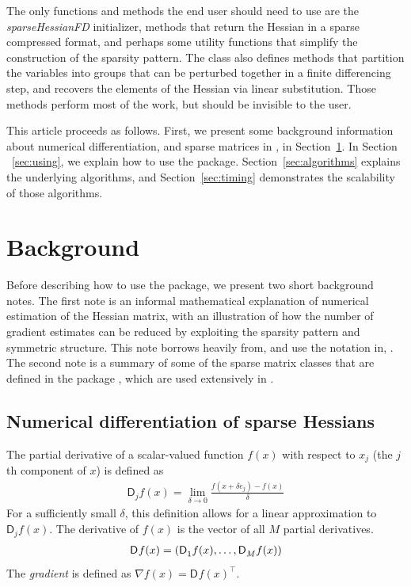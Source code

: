 \documentclass[article]{jss}\usepackage[]{graphicx}\usepackage[]{color}
\newcommand{\class}[1]{\textsl{#1}}
\newcommand{\parD}[3]{\mathsf{D}^{#1}_{#2}#3}
\begin{document}
The only functions and methods the end user should need to use are the
\class{sparseHessianFD} initializer, methods that return the Hessian
in a sparse compressed format, and perhaps some utility functions that
simplify the construction of the sparsity pattern.  The class also
defines methods that partition
the variables into groups that can be perturbed together in a finite
differencing step, and recovers the elements of the Hessian via linear
substitution.  Those methods perform most of the work, but should be
invisible to the user.

This article proceeds as follows.  First, we present
some background information about numerical differentiation, and
sparse matrices in , in Section~\ref{sec:background}.  In
Section ~\ref{sec:using}, we explain how to use the package.
Section~\ref{sec:algorithms} explains the underlying algorithms, and
Section~\ref{sec:timing} demonstrates the scalability of those algorithms.


\section[Background]{Background}\label{sec:background}

Before describing how to use the package, we
present two short background notes.  The first note is an informal
mathematical explanation of numerical estimation of the Hessian
matrix, with an illustration of how the number of gradient estimates
can be reduced by exploiting the sparsity pattern and symmetric
structure.  This note borrows heavily from, and use the notation in,
\citet[Chapter 6]{MagnusNeudecker2007}. The
second note is a summary of some of the sparse matrix classes that are
defined in the  package \citep{R_Matrix}, which are used
extensively in .

\subsection[Numerical differentiation of sparse Hessians]{Numerical
  differentiation of sparse Hessians}\label{sec:numdiff}

The partial derivative of a scalar-valued function $f(x)$ with respect to $x_j$ (the $j$th
component of $x$) is defined as
\begin{align}
  \label{eq:defParD}
\parD{}{j}{f(x)}=\lim\limits_{\delta\to 0}\frac{f(x+\delta e_j)-f(x)}{\delta}
\end{align}
For a sufficiently small $\delta$, this definition allows for a
linear approximation to $\parD{}{j}{f(x)}$.  The derivative of $f(x)$
is the vector of all $M$ partial derivatives.
\begin{align}
  \parD{}{}{f(x)}=\left(\parD{}{1}{f(x)},\mathellipsis,\parD{}{M}{f(x)}\right)
  \end{align}
 The \emph{gradient} is defined as $\nabla f(x)=\parD{}{}{f(x)}^\top$.
\end{document}

